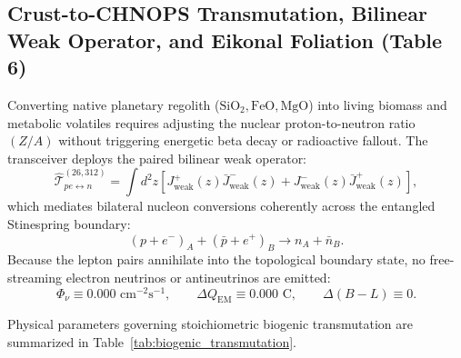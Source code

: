 \documentclass[11pt,onecolumn]{article}
\begin{document}
\subsection{Crust-to-CHNOPS Transmutation, Bilinear Weak Operator, and Eikonal Foliation (Table 6)}
Converting native planetary regolith ($\text{SiO}_2, \text{FeO}, \text{MgO}$) into living biomass and metabolic volatiles requires adjusting the nuclear proton-to-neutron ratio $(Z/A)$ without triggering energetic beta decay or radioactive fallout. The transceiver deploys the paired bilinear weak operator:
\begin{equation}
\hat{\mathcal{T}}_{pe\leftrightarrow n}^{(26,312)} = \int d^2z \left[ J_{\text{weak}}^+(z) \bar{J}_{\text{weak}}^-(z) + J_{\text{weak}}^-(z) \bar{J}_{\text{weak}}^+(z) \right],
\label{eq:bilinear_weak_operator}
\end{equation}
which mediates bilateral nucleon conversions coherently across the entangled Stinespring boundary:
\begin{equation}
(p + e^-)_A + (\bar{p} + e^+)_B \longrightarrow n_A + \bar{n}_B.
\label{eq:bilateral_weak_conversion}
\end{equation}
Because the lepton pairs annihilate into the topological boundary state, no free-streaming electron neutrinos or antineutrinos are emitted:
\begin{equation}
\Phi_\nu \equiv 0.000\text{ cm}^{-2}\text{s}^{-1}, \qquad \Delta Q_{\text{EM}} \equiv 0.000\text{ C}, \qquad \Delta(B-L) \equiv 0.
\label{eq:neutrino_null}
\end{equation}

Physical parameters governing stoichiometric biogenic transmutation are summarized in Table~\ref{tab:biogenic_transmutation}.
\end{document}
